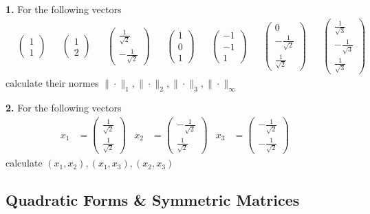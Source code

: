 \documentclass[12pt]{article}
\begin{document}
\textbf{1.} For the following vectors 
\begin{align*}
	&\begin{pmatrix} 1 \\ 1\end{pmatrix} &
	&\begin{pmatrix} 1 \\ 2\end{pmatrix} &
	&\begin{pmatrix} \frac{1}{\sqrt{2}} \\ -\frac{1}{\sqrt{2}} \end{pmatrix} &
	&\begin{pmatrix} 1 \\ 0 \\ 1\end{pmatrix} &
	&\begin{pmatrix} -1 \\ -1 \\ 1 \end{pmatrix} &
	&\begin{pmatrix} 0 \\ -\frac{1}{\sqrt{2}} \\  \frac{1}{\sqrt{2}} \end{pmatrix} &
	&\begin{pmatrix} \frac{1}{\sqrt{3}} \\ -\frac{1}{\sqrt{3}} \\  \frac{1}{\sqrt{3}} \end{pmatrix}
\end{align*}
calculate their normes 
\(\|\cdot\|_1,\|\cdot\|_2, \|\cdot\|_3,\|\cdot\|_\infty\)

\textbf{2.} For the following vectors 
\begin{align*}
	x_1 &=\begin{pmatrix} \frac{1}{\sqrt{2}} \\ \frac{1}{\sqrt{2}} \end{pmatrix} &
	x_2 &=\begin{pmatrix} -\frac{1}{\sqrt{2}} \\ \frac{1}{\sqrt{2}} \end{pmatrix} &	
	x_3 &=\begin{pmatrix} -\frac{1}{\sqrt{2}} \\ -\frac{1}{\sqrt{2}} \end{pmatrix} &
\end{align*}
calculate \((x_1,x_2), (x_1,x_3), (x_2,x_3)\)

\subsection{Quadratic Forms \& Symmetric Matrices}
\end{document}
